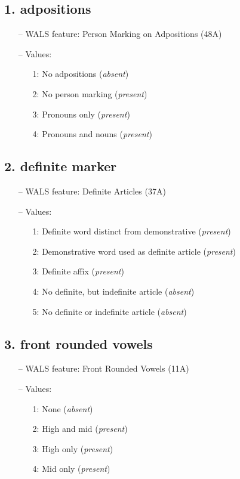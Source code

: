 \subsection*{1. adpositions}

\begin{itemize}
  \item[--] WALS feature: Person Marking on Adpositions (48A)
  \item[--] Values:
  {\small
  \begin{enumerate}
    \item[1:] No adpositions (\emph{absent})
    \item[2:] No person marking (\emph{present})
    \item[3:] Pronouns only (\emph{present})
    \item[4:] Pronouns and nouns (\emph{present})
  \end{enumerate}
  }
\end{itemize}


\subsection*{2. definite marker}

\begin{itemize}
  \item[--] WALS feature: Definite Articles (37A)
  \item[--] Values:
  {\small
  \begin{enumerate}
    \item[1:] Definite word distinct from demonstrative (\emph{present})
    \item[2:] Demonstrative word used as definite article (\emph{present})
    \item[3:] Definite affix (\emph{present})
    \item[4:] No definite, but indefinite article (\emph{absent})
    \item[5:] No definite or indefinite article (\emph{absent})
  \end{enumerate}
  }
\end{itemize}


\subsection*{3. front rounded vowels}

\begin{itemize}
  \item[--] WALS feature: Front Rounded Vowels (11A)
  \item[--] Values:
  {\small
  \begin{enumerate}
    \item[1:] None (\emph{absent})
    \item[2:] High and mid (\emph{present})
    \item[3:] High only (\emph{present})
    \item[4:] Mid only (\emph{present})
  \end{enumerate}
  }
\end{itemize}


